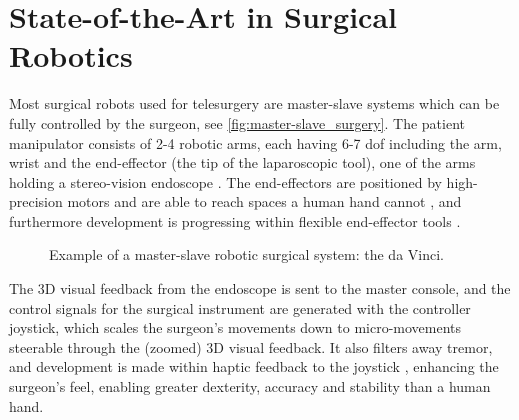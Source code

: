 






\section{State-of-the-Art in Surgical Robotics}

\vspace{-1mm}
Most surgical robots used for telesurgery are master-slave systems which can be fully controlled by the surgeon, see \autoref{fig:master-slave_surgery}. %
The patient manipulator consists of 2-4 robotic arms, each having 6-7 \gls{dof} %
including the arm, wrist and the end-effector (the tip of the laparoscopic tool), one of the arms holding a stereo-vision \gls{endoscope} \citep{bib:raven_debride}. 
The end-effectors are positioned by high-precision motors and are able to reach spaces a human hand cannot \citep{bib:docatadist}, and furthermore development is progressing within flexible end-effector tools \citep[p 74]{bib:surgical_book}. %

\vspace{-3mm}
\begin{figure}[htbp]
\hspace*{-5mm}
%
%
\caption{Example of a master-slave robotic surgical system: the da Vinci.}
\label{fig:master-slave_surgery}
\end{figure}

The 3D visual feedback from the endoscope is sent to the master console, %
and the control signals for the surgical instrument are generated with the controller joystick, which scales the surgeon's movements down to micro-movements \citep{bib:intuitive_monopoly} steerable through the (zoomed) 3D visual feedback. It also filters away tremor, and development is made within haptic feedback to the joystick \citep[p 89]{bib:surgical_book}, enhancing the surgeon's feel, enabling greater dexterity, accuracy and stability than a human hand.

